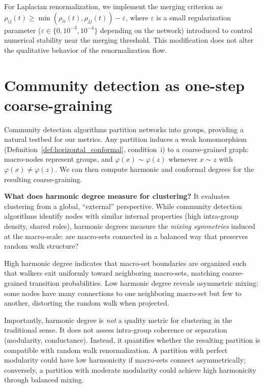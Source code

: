 \documentclass[twocolumn,superscriptaddress,tightenlines,aps,prx,floatfix]{revtex4-2}
\begin{document}
\begin{bibunit}
For Laplacian renormalization, we implement the merging criterion as $\rho_{ij}(t) \geq \min(\rho_{ii}(t), \rho_{jj}(t)) - \varepsilon$, where $\varepsilon$ is a small regularization parameter ($\varepsilon \in \{0, 10^{-3}, 10^{-4}\}$ depending on the network) introduced to control numerical stability near the merging threshold. This modification does not alter the qualitative behavior of the renormalization flow.



\section{Community detection as one-step coarse-graining}
\label{sec:clustering_sm}

Community detection algorithms partition networks into groups, providing a natural testbed for our metrics. Any partition induces a weak homomorphism (Definition~\ref*{def:horizontal_conformal}, condition~i) to a coarse-grained graph: macro-nodes represent groups, and $\varphi(x) \sim \varphi(z)$ whenever $x \sim z$ with $\varphi(x) \neq \varphi(z)$. We can then compute harmonic and conformal degrees for the resulting coarse-graining.

\textbf{What does harmonic degree measure for clustering?} It evaluates clustering from a global, ``external'' perspective. While community detection algorithms identify nodes with similar internal properties (high intra-group density, shared roles), harmonic degrees measure the \emph{mixing symmetries} induced at the macro-scale: are macro-sets connected in a balanced way that preserves random walk structure?

High harmonic degree indicates that macro-set boundaries are organized such that walkers exit uniformly toward neighboring macro-sets, matching coarse-grained transition probabilities. Low harmonic degree reveals asymmetric mixing: some nodes have many connections to one neighboring macro-set but few to another, distorting the random walk when projected.

Importantly, harmonic degree is \emph{not} a quality metric for clustering in the traditional sense. It does not assess intra-group coherence or separation (modularity, conductance). Instead, it quantifies whether the resulting partition is compatible with random walk renormalization. A partition with perfect modularity could have low harmonicity if macro-sets connect asymmetrically; conversely, a partition with moderate modularity could achieve high harmonicity through balanced mixing.



\end{bibunit}
\end{document}
